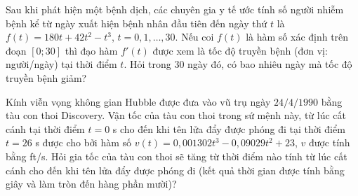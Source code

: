 \begin{bt}%
	Sau khi phát hiện một bệnh dịch, các chuyên gia y tế ước tính số người nhiễm bệnh kể từ ngày xuất hiện bệnh nhân đầu tiên đến ngày thứ  $t$ là $f(t)=180t+42t^2-t^3$, $t=0,1,\ldots,30$. Nếu coi $f(t)$ là hàm số xác định trên đoạn $[0;30]$ thì đạo hàm $f'(t)$ được xem là tốc độ truyền bệnh (đơn vị: người/ngày) tại thời điểm $t$. Hỏi trong $30$ ngày đó, có bao nhiêu ngày mà tốc độ truyền bệnh giảm?
\end{bt}

\begin{bt}%
	Kính viễn vọng không gian Hubble được đưa vào vũ  trụ ngày $24/4/1990$ bằng tàu con thoi Discovery. Vận tốc của tàu con thoi trong sứ mệnh này, từ lúc cất cánh tại thời điểm $t=0$ s cho đến khi tên lửa đẩy được phóng đi tại thời điểm $t=26$ s được cho bởi hàm số $v(t)=0{,}001302t^3-0{,}09029t^2+23$, $v$ được tính bằng ft/s. Hỏi gia tốc của tàu con thoi sẽ tăng từ thời điểm nào tính từ lúc cất cánh cho đến khi tên lửa đẩy được phóng đi (kết quả thời gian được tính bằng giây và làm tròn đến hàng phần mười)?
\end{bt}


